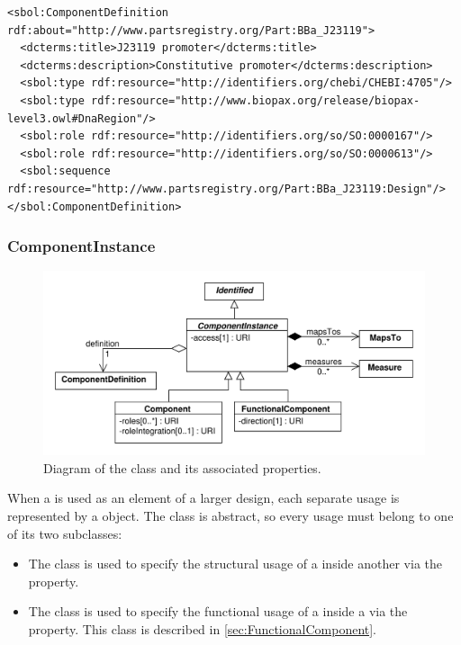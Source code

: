 \begin{lstlisting}
<sbol:ComponentDefinition rdf:about="http://www.partsregistry.org/Part:BBa_J23119">
  <dcterms:title>J23119 promoter</dcterms:title>
  <dcterms:description>Constitutive promoter</dcterms:description>
  <sbol:type rdf:resource="http://identifiers.org/chebi/CHEBI:4705"/>
  <sbol:type rdf:resource="http://www.biopax.org/release/biopax-level3.owl#DnaRegion"/>
  <sbol:role rdf:resource="http://identifiers.org/so/SO:0000167"/>
  <sbol:role rdf:resource="http://identifiers.org/so/SO:0000613"/>
  <sbol:sequence rdf:resource="http://www.partsregistry.org/Part:BBa_J23119:Design"/>
</sbol:ComponentDefinition>
\end{lstlisting}


\subsubsection{ComponentInstance}
\label{sec:ComponentInstance}

\begin{figure}[ht]
\begin{center}
\includegraphics[scale=0.6]{uml/component_instance}
\caption[]{Diagram of the  class and its associated properties.}
\label{uml:component}
\end{center}
\end{figure}

When a  is used as an element of a larger design, each separate usage is represented by a  object.  
The  class is abstract, so every usage must belong to one of its two subclasses:
\begin{itemize}
\item The  class is used to specify the structural usage of a  inside another  via the  property.
\item The  class is used to specify the functional usage of a  inside a  via the  property. This class is described in \ref{sec:FunctionalComponent}.
\end{itemize}

